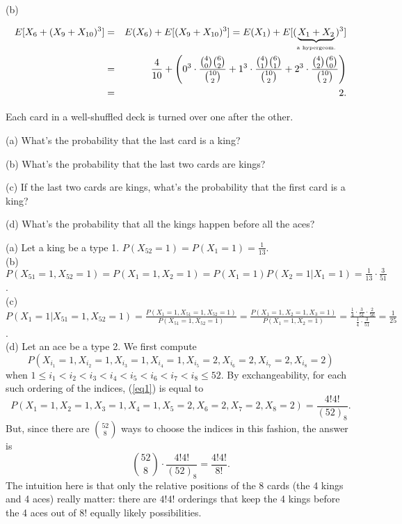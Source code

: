 \documentclass[12pt]{article}
\begin{document}
\noindent (b)

\begin{eqnarray*}
E[X_6 + (X_9 + X_{10})^3]&=& E(X_6) + E[(X_9 + X_{10})^3] = E(X_1) + E[(\underbrace{X_1 + X_2}_{\mbox{\tiny a hypergeom.}})^3]\\
&=& \frac 4{10} + \left( 0^3\cdot \frac {{4\choose 0}{6\choose 2}}{{10\choose 2}} + 1^3\cdot \frac {{4\choose 1}{6\choose 1}}{{10\choose 2}} + 2^3\cdot \frac {{4\choose 2}{6\choose 0}}{{10\choose 2}}\right)\\
&=& 2.\\
\end{eqnarray*}


\newpage


\noindent Each card in a well-shuffled deck is turned over one after the other.

(a) What's the probability that the last card is a king?

(b) What's the probability that the last two cards are kings?

(c) If the last two cards are kings, what's the probability that the first card is a king?

(d) What's the probability that all the kings happen before all the aces?\\



\noindent (a) Let a king be a type 1. $P(X_{52}=1)=P(X_1=1)=\frac 1{13}$.\\

\noindent (b) $P(X_{51}=1,X_{52}=1) = P(X_1=1,X_2=1) = P(X_1=1)P(X_2=1|X_1=1) = \frac 1{13}\cdot \frac 3{51}$.\\

\noindent (c) $P(X_1=1|X_{51}=1,X_{52}=1) = \frac {P(X_1=1,X_{51}=1,X_{52}=1)}{P(X_{51}=1,X_{52}=1)}=\frac {P(X_1=1,X_{2}=1,X_{3}=1)}{P(X_{1}=1,X_{2}=1)}=\frac {\frac 14\cdot \frac {3}{51}\cdot\frac {2}{50}}{\frac 14\cdot\frac 3{51}}=\frac 1{25}$.\\

\noindent (d) Let an ace be a type 2. We first compute
\begin{equation}P(X_{i_1}=1,X_{i_2}=1,X_{i_3}=1,X_{i_4}=1,X_{i_5}=2,X_{i_6}=2,X_{i_7}=2,X_{i_8}=2)\label{eq1}\end{equation}
when $1\le i_1<i_2<i_3<i_4<i_5<i_6<i_7<i_8\le 52$.  By exchangeability, for each such ordering of the indices, (\ref{eq1}) is equal to
\begin{equation}P(X_{1}=1,X_{2}=1,X_{3}=1,X_{4}=1,X_{5}=2,X_{6}=2,X_{7}=2,X_{8}=2)=\frac {4!4!}{(52)_8}.\label{eq2}\end{equation}
But, since there are ${52\choose 8}$ ways to choose the indices in this fashion, the answer is
$${52\choose 8}\cdot \frac {4!4!}{(52)_8} = \frac {4!4!}{8!}.$$
The intuition here is that only the relative positions of the 8 cards (the 4 kings and 4 aces) really matter: there are $4!4!$ orderings that keep the 4 kings before the
4 aces out of $8!$ equally likely possibilities.
\end{document}
